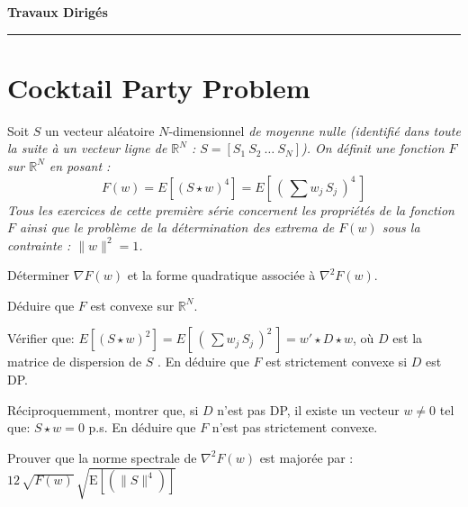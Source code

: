 \documentclass[12pt,a4paper,fleqn]{report}
\makeatletter
\def\cleardoublepage{\clearpage\if@twoside\ifodd\c@page\else\hbox{}\thispagestyle{empty}\newpage\fi\fi}
\newcommand{\R}{\mathbb R}
\newcommand{\grad}{\nabla}
\newcommand{\hess}{\nabla^2}
\newcommand{\on}{\begin{displaymath}}
\newcommand{\off}{\end{displaymath}}
\makeatother
\begin{document}
\cleardoublepage



\begin{center}

\textbf{\huge Travaux Dirig\'es }

\smallskip

\rule{10cm}{0.4pt}

\end{center}


\section{Cocktail Party Problem}

Soit $S$ un vecteur aléatoire $N$-dimensionnel  \it de moyenne nulle \rm (identifié dans toute la suite à un vecteur ligne de $\R^N$ : $S=[S_1\ S_2\ \ldots\ S_N]$).
On définit une fonction $F$ sur $\R^N$ en posant : 
\on F(w)=E[(S\star w)^4]=E\left[\,\left( \,\sum w_j\,S_j\,\right)^4\,\right] \off
Tous les exercices de cette première série concernent les propriétés de  la fonction $F$ ainsi que le problème de la détermination des extrema de $F(w)$ sous la contrainte : $\|w\|^2=1$. 

\begin{exercice}
\rien
\begin{questions}
\item Déterminer  $ \grad F(w)$ et  la forme quadratique associée à $\hess F(w)$.
\item Déduire que $F$ est convexe sur $\R^N$.
\item Vérifier que: 
\mbox{$ E[(S\star w)^2]=E\left[\,\left( \,\sum w_j\,S_j\,\right)^2\,\right] =w'\star D\star w $}, 
où $D$ est la matrice de dispersion de $S$ . En déduire que $F$ est strictement convexe si  $D$ est DP.
\item Réciproquemment, montrer que, si $D$ n'est pas DP, il existe un vecteur $w\neq 0$ tel que: $S\star w=0$ p.s. En déduire que $F$ n'est pas strictement convexe.  
\item Prouver que la norme spectrale de $\hess F(w)$  est majorée par :  $12\,\sqrt{F(w)}\,\sqrt{ \mbox{E} [(\| S\|^4)]}$\end{questions}
\end{exercice}
\end{document}
